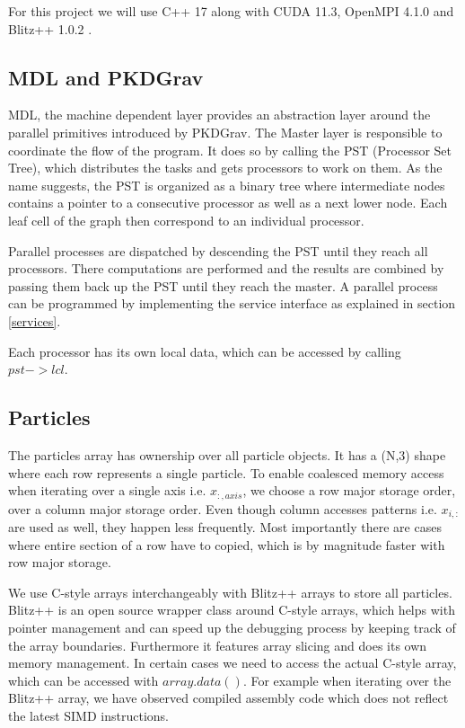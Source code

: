 \documentclass[]{article}
\begin{document}
For this project we will use C++ 17 along with CUDA 11.3, OpenMPI 4.1.0 and Blitz++ 1.0.2 \cite{blitzcpp}. 

\subsection{MDL and PKDGrav}

MDL, the machine dependent layer provides an abstraction layer around the parallel primitives introduced by PKDGrav. The Master layer is responsible to coordinate the flow of the program. It does so by calling the PST (Processor Set Tree), which distributes the tasks and gets processors to work on them. As the name suggests, the PST is organized as a binary tree where intermediate nodes contains a pointer to a consecutive processor as well as a next lower node. Each leaf cell of the graph then correspond to an individual processor.

Parallel processes are dispatched by descending the PST until they reach all processors. There computations are performed and the results are combined by passing them back up the PST until they reach the master.
A parallel process can be programmed by implementing the service interface as explained in section \ref{services}.

Each processor has its own local data, which can be accessed by calling $pst->lcl$. 

\subsection{Particles}

The particles array has ownership over all particle objects. It has a (N,3) shape where each row represents a single particle. To enable coalesced memory access when iterating over a single axis i.e. $x_{:, axis}$, we choose a row major storage order, over a column major storage order. Even though column accesses patterns i.e. $x_{i,:}$ are used as well, they happen less frequently. Most importantly there are cases where entire section of a row have to copied, which is by magnitude faster with row major storage.

We use C-style arrays interchangeably with Blitz++ arrays to store all particles. Blitz++ is an open source wrapper class around C-style arrays, which helps with pointer management and can speed up the debugging process by keeping track of the array boundaries. Furthermore it features array slicing and does its own memory management. In certain cases we need to access the actual C-style array, which can be accessed with $array.data()$. For example when iterating over the Blitz++ array, we have observed compiled assembly code  which does not reflect the latest SIMD instructions.
\end{document}
